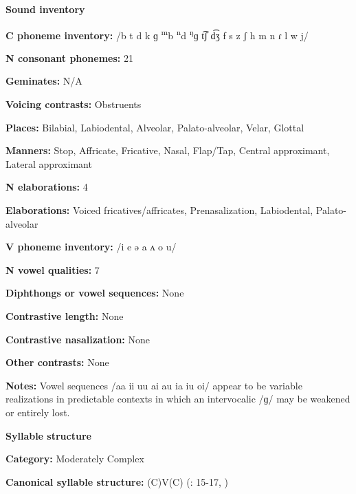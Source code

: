 \textbf{Sound inventory}



\textbf{C phoneme inventory:} /b t d k ɡ \textsuperscript{m}b \textsuperscript{n}d \textsuperscript{ŋ}ɡ t͡ʃ d͡ʒ f s z ʃ h m n ɾ l w j/



\textbf{N consonant phonemes:} 21



\textbf{Geminates:} N/A



\textbf{Voicing contrasts:} Obstruents



\textbf{Places:} Bilabial, Labiodental, Alveolar, Palato-alveolar, Velar, Glottal



\textbf{Manners:} Stop, Affricate, Fricative, Nasal, Flap/Tap, Central approximant, Lateral approximant



\textbf{N elaborations:} 4



\textbf{Elaborations:} Voiced fricatives/affricates, Prenasalization, Labiodental, Palato-alveolar



\textbf{V phoneme inventory:} /i e ə a ʌ o u/



\textbf{N vowel qualities:} 7



\textbf{Diphthongs or vowel sequences:} None



\textbf{Contrastive length:} None



\textbf{Contrastive nasalization:} None



\textbf{Other contrasts:} None



\textbf{Notes:} Vowel sequences /aa ii uu ai au ia iu oi/ appear to be variable realizations in predictable contexts in which an intervocalic /ɡ/ may be weakened or entirely lost.



\textbf{Syllable structure}



\textbf{Category:} Moderately Complex



\textbf{Canonical syllable structure:} (C)V(C) (\citealt{Hutchison1981}: 15-17, \citealt{Cyffer1998})



